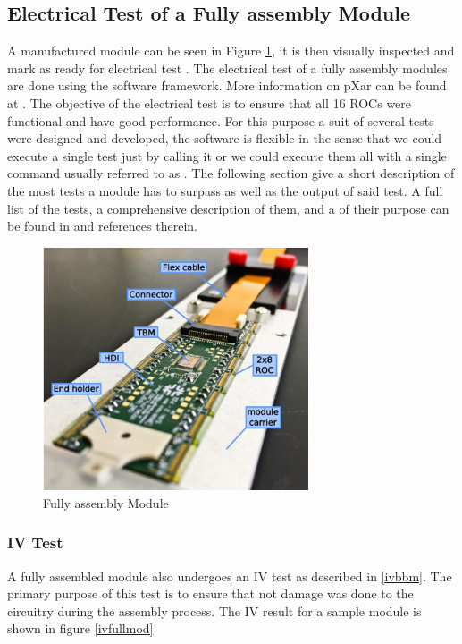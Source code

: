 \subsection{Electrical Test of a Fully assembly Module}
A manufactured module can be seen in Figure \ref{fig:fully_asem_mod}, it is then visually inspected and mark as ready for electrical test {}. 
The electrical test of a fully assembly modules are done using the  software framework. More information on pXar can be found at \cite{pxar}. The objective of the electrical test is to ensure that all 16 ROCs were functional and have good performance. For this purpose a suit of several tests were designed and developed, the software is flexible in the sense that we could execute a single test just by calling it or we could execute them all with a single command usually referred to as . 
The following section {} give a short description of the most  tests a module has to surpass as well as the output of said test. A full list of the tests, a comprehensive description of them, and a {} of their purpose can be found in \cite{fpix_module_testing_guide} and references therein. 

\begin{figure}[!h]
  \centering
  \includegraphics[width=0.7\textwidth]{../images/ch7/fully_asem_mod}
  \caption[Fully assembly Module]{Fully assembly Module}\label{fig:fully_asem_mod}
\end{figure}

\subsubsection{IV Test}
A fully assembled module also undergoes an IV test as described in \ref{ivbbm}. The primary purpose of this test is to ensure that not damage was done to the circuitry during the assembly process. The IV result for a sample module is shown in figure \ref{ivfullmod}


